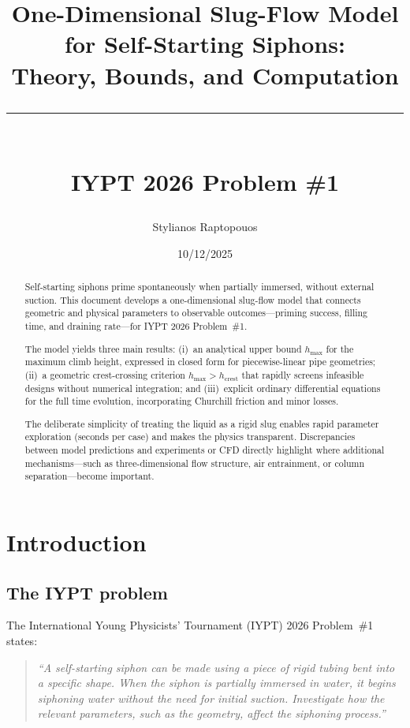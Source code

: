 \documentclass[11pt]{article}
\title{One-Dimensional Slug-Flow Model for Self-Starting Siphons:\\
       Theory, Bounds, and Computation\\[0.5em]
       \rule{\textwidth}{0.4pt}\\[0.5em]
       \large IYPT 2026 Problem \#1}
\author{Stylianos Raptopouos}
\date{10/12/2025}
\theoremstyle{definition}
\begin{document}
\maketitle

\begin{abstract}
Self-starting siphons prime spontaneously when partially immersed, without external suction. 
This document develops a one-dimensional slug-flow model that connects geometric and physical 
parameters to observable outcomes---priming success, filling time, and draining rate---for 
IYPT 2026 Problem~\#1.

The model yields three main results: (i)~an analytical upper bound $h_{\max}$ for the maximum 
climb height, expressed in closed form for piecewise-linear pipe geometries; (ii)~a geometric 
crest-crossing criterion $h_{\max} > h_{\text{crest}}$ that rapidly screens infeasible designs 
without numerical integration; and (iii)~explicit ordinary differential equations for the full 
time evolution, incorporating Churchill friction and minor losses.

The deliberate simplicity of treating the liquid as a rigid slug enables rapid parameter 
exploration (seconds per case) and makes the physics transparent. Discrepancies between 
model predictions and experiments or CFD directly highlight where additional mechanisms---such 
as three-dimensional flow structure, air entrainment, or column separation---become important.
\end{abstract}

\tableofcontents
\newpage

\section{Introduction}
\label{sec:intro}

\subsection{The IYPT problem}

The International Young Physicists' Tournament (IYPT) 2026 Problem~\#1 states:
\begin{quote}
\emph{``A self-starting siphon can be made using a piece of rigid tubing bent into a specific 
shape. When the siphon is partially immersed in water, it begins siphoning water without the 
need for initial suction. Investigate how the relevant parameters, such as the geometry, 
affect the siphoning process.''}
\end{quote}
\end{document}
